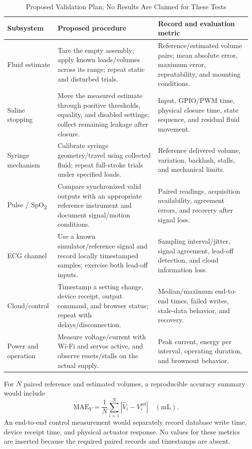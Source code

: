 \begin{table}[!t]
\caption{Proposed Validation Plan; No Results Are Claimed for These Tests}\label{tab:validation}
\centering\small
\begin{tabularx}{\textwidth}{@{}P{0.20\textwidth}YY@{}}
\toprule
Subsystem & Proposed procedure & Record and evaluation metric \\
\midrule
Fluid estimate & Tare the empty assembly; apply known loads/volumes across its range; repeat static and disturbed trials. & Reference/estimated volume pairs; mean absolute error, maximum error, repeatability, and mounting conditions. \\
Saline stopping & Move the measured estimate through positive thresholds, equality, and disabled settings; collect remaining leakage after closure. & Input, GPIO/PWM time, physical closure time, state sequence, and residual fluid movement. \\
Syringe mechanism & Calibrate syringe geometry/travel using collected fluid; repeat full-stroke trials under specified loads. & Reference delivered volume, variation, backlash, stalls, and mechanical limits. \\
Pulse / SpO\textsubscript{2} & Compare synchronized valid outputs with an appropriate reference instrument and document signal/motion conditions. & Paired readings, acquisition availability, agreement errors, and recovery after signal loss. \\
ECG channel & Use a known simulator/reference signal and record locally timestamped samples; exercise both lead-off inputs. & Sampling interval/jitter, signal agreement, lead-off detection, and cloud information loss. \\
Cloud/control & Timestamp a setting change, device receipt, output command, and browser status; repeat with delays/disconnection. & Median/maximum end-to-end times, failed writes, stale-data behavior, and recovery. \\
Power and operation & Measure voltage/current with Wi-Fi and servos active, and observe resets/stalls on the actual supply. & Peak current, energy per interval, operating duration, and brownout behavior. \\
\bottomrule
\end{tabularx}
\end{table}

For $N$ paired reference and estimated volumes, a reproducible accuracy summary would include
\begin{equation}
\mathrm{MAE}_V=\frac{1}{N}\sum_{i=1}^{N}|\hat V_i-V_i^{\mathrm{ref}}|\quad(\mathrm{mL}).
\end{equation}
An end-to-end control measurement would separately record database write time, device receipt time, and physical actuator response. No values for these metrics are inserted because the required paired records and timestamps are absent.

